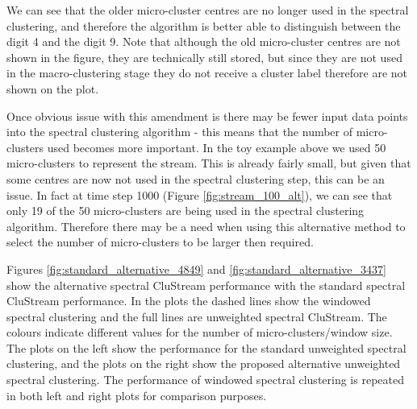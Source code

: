 We can see that the older micro-cluster centres are no longer used in the spectral clustering, and therefore the algorithm is better able to distinguish between the digit 4 and the digit 9. Note that although the old micro-cluster centres are not shown in the figure, they are technically still stored, but since they are not used in the macro-clustering stage they do not receive a cluster label therefore are not shown on the plot. 

Once obvious issue with this amendment is there may be fewer input data points into the spectral clustering algorithm - this means that the number of micro-clusters used becomes more important.  In the toy example above we used 50 micro-clusters to represent the stream. This is already fairly small, but given that some centres are now not used in the spectral clustering step, this can be an issue. In fact at time step 1000 (Figure \ref{fig:stream_100_alt}), we can see that only 19 of the 50 micro-clusters are being used in the spectral clustering algorithm. Therefore there may be a need when using this alternative method to select the number of micro-clusters to be larger then required.  


Figures \ref{fig:standard_alternative_4849} and \ref{fig:standard_alternative_3437} show the alternative spectral CluStream performance with the standard spectral CluStream performance.   In the plots the dashed lines show the windowed spectral clustering and the full lines are unweighted spectral CluStream. The colours indicate different values for the number of micro-clusters/window size. The plots on the left show the performance for the standard unweighted spectral clustering, and the plots on the right show the proposed alternative unweighted spectral clustering. The performance of windowed spectral clustering is repeated in both left and right plots for comparison purposes. 



